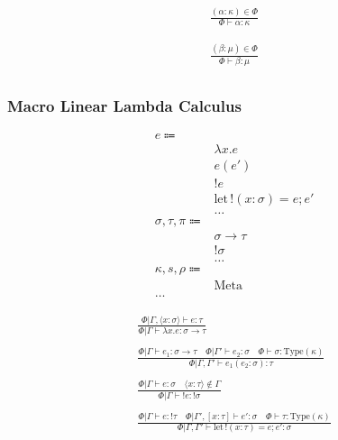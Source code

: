 \documentclass {article}
\begin{document}
\begin{gather*}
\frac
{(\alpha : \kappa) \in \Phi}
{\Phi \vdash \alpha : \kappa}
\end{gather*}

\begin{gather*}
\frac
{(\beta : \mu) \in \Phi}
{\Phi \vdash \beta : \mu } \\
\end{gather*}

\subsubsection{Macro Linear Lambda Calculus}
\begin{align*}
e \Coloneqq & \\
& \lambda x. e \tag{Macro Lambda}\\
& e(e') \tag{Macro Application}\\
& !e \tag{Bang Introduction} \\
& \text{let} \, !(x : \sigma) = e; e' \tag{Bang Elimination} \\
& \dots \\
\sigma, \tau, \pi \Coloneqq & \\
& \sigma \to \tau \tag{Macro} \\
& !\sigma \tag{Bang} \\
& \dots \\
\kappa, s, \rho \Coloneqq & \\
& \text{Meta} \tag{Meta Stage} \\
\dots
\end{align*}

\begin{gather*}
\frac
{\Phi | \Gamma, \langle x : \sigma \rangle \vdash e : \tau}
{\Phi | \Gamma \vdash \lambda x. e : \sigma \to \tau } \\
\\
\frac
{\Phi | \Gamma \vdash e_1 : \sigma \to \tau \quad \Phi | \Gamma' \vdash e_2 : \sigma \quad \Phi \vdash \sigma : \text{Type} (\kappa)}
{\Phi | \Gamma, \Gamma' \vdash e_1(e_2 : \sigma) : \tau} \\
\\
\frac
{\Phi | \Gamma \vdash e : \sigma \quad \langle x : \tau \rangle \notin \Gamma }
{\Phi | \Gamma \vdash !e : !\sigma } \\
\\
\frac
{\Phi | \Gamma \vdash e : !\tau \quad \Phi | \Gamma', [x : \tau] \vdash e' : \sigma \quad \Phi \vdash \tau : \text{Type} (\kappa) }
{\Phi | \Gamma, \Gamma' \vdash \text{let} \, !(x : \tau) = e; e' : \sigma}  \\
\end{gather*}
\end{document}
